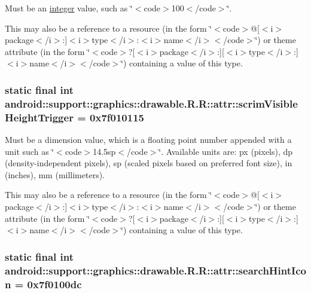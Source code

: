 Must be an \hyperlink{classandroid_1_1support_1_1graphics_1_1drawable_1_1_r_1_1integer}{integer} value, such as \char`\"{}$<$code$>$100$<$/code$>$\char`\"{}. 

This may also be a reference to a resource (in the form \char`\"{}$<$code$>$@\mbox{[}$<$i$>$package$<$/i$>$:\mbox{]}$<$i$>$type$<$/i$>$:$<$i$>$name$<$/i$>$$<$/code$>$\char`\"{}) or theme attribute (in the form \char`\"{}$<$code$>$?\mbox{[}$<$i$>$package$<$/i$>$:\mbox{]}\mbox{[}$<$i$>$type$<$/i$>$:\mbox{]}$<$i$>$name$<$/i$>$$<$/code$>$\char`\"{}) containing a value of this type. \hypertarget{classandroid_1_1support_1_1graphics_1_1drawable_1_1_r_1_1attr_4d435e4210ccc1182f1a00ff1b7ac2c0}{
\subsubsection[{scrimVisibleHeightTrigger}]{\setlength{\rightskip}{0pt plus 5cm}static final int android::support::graphics::drawable.R.R::attr::scrimVisibleHeightTrigger = 0x7f010115}}
\label{classandroid_1_1support_1_1graphics_1_1drawable_1_1_r_1_1attr_4d435e4210ccc1182f1a00ff1b7ac2c0}


Must be a dimension value, which is a floating point number appended with a unit such as \char`\"{}$<$code$>$14.5sp$<$/code$>$\char`\"{}. Available units are: px (pixels), dp (density-independent pixels), sp (scaled pixels based on preferred font size), in (inches), mm (millimeters). 

This may also be a reference to a resource (in the form \char`\"{}$<$code$>$@\mbox{[}$<$i$>$package$<$/i$>$:\mbox{]}$<$i$>$type$<$/i$>$:$<$i$>$name$<$/i$>$$<$/code$>$\char`\"{}) or theme attribute (in the form \char`\"{}$<$code$>$?\mbox{[}$<$i$>$package$<$/i$>$:\mbox{]}\mbox{[}$<$i$>$type$<$/i$>$:\mbox{]}$<$i$>$name$<$/i$>$$<$/code$>$\char`\"{}) containing a value of this type. \hypertarget{classandroid_1_1support_1_1graphics_1_1drawable_1_1_r_1_1attr_19799adab78d09f4b40782bb8613b1b5}{
\subsubsection[{searchHintIcon}]{\setlength{\rightskip}{0pt plus 5cm}static final int android::support::graphics::drawable.R.R::attr::searchHintIcon = 0x7f0100dc}}
\label{classandroid_1_1support_1_1graphics_1_1drawable_1_1_r_1_1attr_19799adab78d09f4b40782bb8613b1b5}


